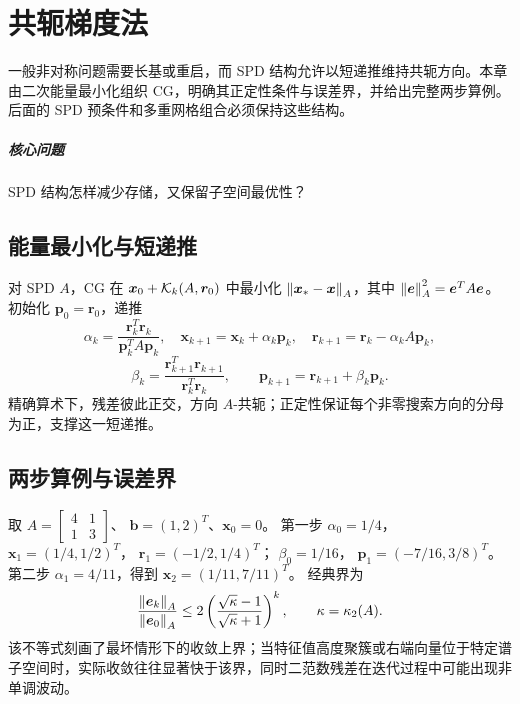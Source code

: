 \chapter{共轭梯度法}\label{v0ch:13}
\begin{chaptersummary}
一般非对称问题需要长基或重启，而 SPD 结构允许以短递推维持共轭方向。本章由二次能量最小化组织 CG，明确其正定性条件与误差界，并给出完整两步算例。后面的 SPD 预条件和多重网格组合必须保持这些结构。
\end{chaptersummary}
\paragraph{核心问题}SPD 结构怎样减少存储，又保留子空间最优性？

\section{能量最小化与短递推}
对 SPD $A$，CG 在 $\bm x_0+\mathcal K_k(A,\bm r_0)$ 中最小化
$\left\lVert \bm x_*-\bm x\right\rVert_A$，其中 $\left\lVert \bm e\right\rVert_A^2=\bm e^TA\bm e$。
初始化 $\bm p_0=\bm r_0$，递推
\[
 \alpha_k=\frac{\bm r_k^T\bm r_k}{\bm p_k^TA\bm p_k},\quad
 \bm x_{k+1}=\bm x_k+\alpha_k\bm p_k,\quad
 \bm r_{k+1}=\bm r_k-\alpha_kA\bm p_k,
\]
\[
 \beta_k=\frac{\bm r_{k+1}^T\bm r_{k+1}}{\bm r_k^T\bm r_k},\qquad
 \bm p_{k+1}=\bm r_{k+1}+\beta_k\bm p_k.
\]
精确算术下，残差彼此正交，方向 $A$-共轭；正定性保证每个非零搜索方向的分母为正，支撑这一短递推。
\section{两步算例与误差界}
取 $A=\left[\begin{smallmatrix}4&1\\1&3\end{smallmatrix}\right]$、
$\bm b=(1,2)^T$、$\bm x_0=0$。
第一步 $\alpha_0=1/4$，
$\bm x_1=(1/4,1/2)^T$，
$\bm r_1=(-1/2,1/4)^T$；
$\beta_0=1/16$，
$\bm p_1=(-7/16,3/8)^T$。
第二步 $\alpha_1=4/11$，得到
$\bm x_2=(1/11,7/11)^T$。
经典界为
\[
 \frac{\left\lVert \bm e_k\right\rVert_A}{\left\lVert \bm e_0\right\rVert_A}
 \le2\left(\frac{\sqrt\kappa-1}{\sqrt\kappa+1}\right)^k,
 \qquad \kappa=\kappa_2(A).
\]
该不等式刻画了最坏情形下的收敛上界；当特征值高度聚簇或右端向量位于特定谱子空间时，实际收敛往往显著快于该界，同时二范数残差在迭代过程中可能出现非单调波动。
